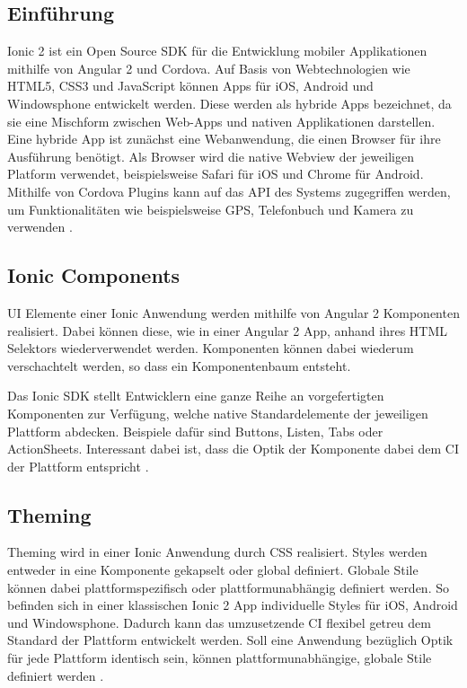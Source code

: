 \subsection{Einführung}

Ionic 2 ist ein Open Source \ac{SDK} für die Entwicklung mobiler Applikationen mithilfe von Angular 2 und Cordova.
Auf Basis von Webtechnologien wie HTML5, CSS3 und JavaScript können Apps für iOS, Android und Windowsphone
entwickelt werden. Diese werden als hybride Apps bezeichnet,
da sie eine Mischform zwischen Web-Apps und nativen Applikationen darstellen.
Eine hybride App ist zunächst eine Webanwendung, die einen Browser für ihre Ausführung benötigt.
Als Browser wird die native Webview der jeweiligen Platform verwendet,
beispielsweise Safari für iOS und Chrome für Android.
Mithilfe von Cordova Plugins kann auf das \ac{API} des Systems zugegriffen werden,
um Funktionalitäten wie beispielsweise GPS, Telefonbuch und Kamera zu verwenden \cite{ionic34:online}.

\subsection{Ionic Components}

\ac{UI} Elemente einer Ionic Anwendung werden mithilfe von Angular 2 Komponenten realisiert.
Dabei können diese, wie in einer Angular 2 App, anhand ihres HTML Selektors wiederverwendet werden.
Komponenten können dabei wiederum verschachtelt werden, so dass ein Komponentenbaum entsteht.

Das Ionic \ac{SDK} stellt Entwicklern eine ganze Reihe an vorgefertigten Komponenten zur Verfügung,
welche native Standardelemente der jeweiligen Plattform abdecken. Beispiele dafür sind Buttons, Listen, Tabs oder ActionSheets.
Interessant dabei ist, dass die Optik der Komponente dabei dem \ac{CI} der Plattform entspricht \cite{ionic99:online}.

\subsection{Theming}
Theming wird in einer Ionic Anwendung durch \ac{CSS} realisiert.
Styles werden entweder in eine Komponente gekapselt oder global definiert.
Globale Stile können dabei plattformspezifisch oder plattformunabhängig definiert werden.
So befinden sich in einer klassischen Ionic 2 App individuelle Styles für iOS, Android und Windowsphone.
Dadurch kann das umzusetzende \ac{CI} flexibel getreu dem Standard der Plattform entwickelt werden.
Soll eine Anwendung bezüglich Optik für jede Plattform identisch sein,
können plattformunabhängige, globale Stile definiert werden \cite{ionic73:online}.


